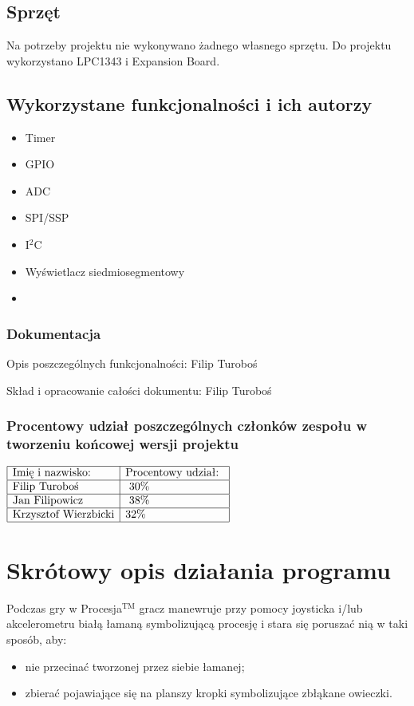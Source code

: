 \documentclass[a4paper,12pt,twoside]{article}
\theoremstyle{plain}
\theoremstyle{definition}
\theoremstyle{remark}
\begin{document}
\subsection{Sprzęt}
Na potrzeby projektu nie wykonywano żadnego własnego sprzętu.
Do projektu wykorzystano LPC1343 i Expansion Board.
\subsection{Wykorzystane funkcjonalności i ich autorzy}

\begin{itemize}
	\item Timer
	\item GPIO
	\item ADC
	\item SPI/SSP
	\item I$^2$C
	\item Wyświetlacz siedmiosegmentowy
	\item 
\end{itemize}
\subsubsection{Dokumentacja}
Opis poszczególnych funkcjonalności: Filip Turoboś

Skład i opracowanie całości dokumentu: Filip Turoboś

\subsubsection{Procentowy udział poszczególnych członków zespołu w tworzeniu końcowej wersji projektu}
$\begin{array}{|l|l|l|}
\hline
\textrm{Imię i nazwisko: }& \textrm{Procentowy udział: }\\
\hline
 \textrm{Filip Turoboś}&\textrm{ 30\%}\\
\hline
\textrm{Jan Filipowicz}&\textrm{	38\% 	}\\
\hline
\textrm{Krzysztof Wierzbicki}& \textrm{32\%}\\
\hline
\end{array}$
\newpage
\section{Skrótowy opis działania programu}
Podczas gry w Procesja$^{\textrm{TM}}$ gracz manewruje przy pomocy joysticka i/lub akcelerometru białą łamaną symbolizującą procesję i stara się poruszać nią w taki sposób, aby:
\begin{itemize}
	\item nie przecinać tworzonej przez siebie łamanej; 
	\item zbierać pojawiające się na planszy kropki symbolizujące zbłąkane owieczki.
\end{itemize}
\end{document}
